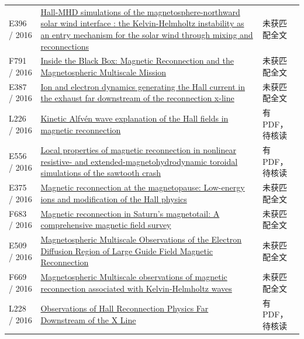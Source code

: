 \begin{longtable}{P{24mm}P{97mm}P{27mm}}
E396 / 2016 & \href{https://ui.adsabs.harvard.edu/abs/2016EGUGA..18.9105L/abstract}{Hall-MHD simulations of the magnetosphere-northward solar wind interface : the Kelvin-Helmholtz instability as an entry mechanism for the solar wind through mixing and reconnections} & 未获匹配全文\\

F791 / 2016 & \href{https://doi.org/10.1002/2015sw001313}{Inside the Black Box: Magnetic Reconnection and the Magnetospheric Multiscale Mission} & 未获匹配全文\\

E387 / 2016 & \href{https://doi.org/10.1063/1.4940322}{Ion and electron dynamics generating the Hall current in the exhaust far downstream of the reconnection x-line} & 未获匹配全文\\

L226 / 2016 & \href{https://doi.org/10.1002/2016gl071044}{Kinetic Alfvén wave explanation of the Hall fields in magnetic reconnection} & 有PDF，待核读\\

E556 / 2016 & \href{https://doi.org/10.1088/1361-6587/59/2/025007}{Local properties of magnetic reconnection in nonlinear resistive- and extended-magnetohydrodynamic toroidal simulations of the sawtooth crash} & 有PDF，待核读\\

E375 / 2016 & \href{https://ui.adsabs.harvard.edu/abs/2016EGUGA..1813235A/abstract}{Magnetic reconnection at the magnetopause: Low-energy ions and modification of the Hall physics} & 未获匹配全文\\

F683 / 2016 & \href{https://doi.org/10.1002/2015ja022005}{Magnetic reconnection in Saturn's magnetotail: A comprehensive magnetic field survey} & 未获匹配全文\\

E509 / 2016 & \href{https://doi.org/10.1103/physrevlett.117.015001}{Magnetospheric Multiscale Observations of the Electron Diffusion Region of Large Guide Field Magnetic Reconnection} & 未获匹配全文\\

F669 / 2016 & \href{https://doi.org/10.1002/2016gl068783}{Magnetospheric Multiscale observations of magnetic reconnection associated with Kelvin‐Helmholtz waves} & 未获匹配全文\\

L228 / 2016 & \href{https://doi.org/10.1103/physrevlett.117.185102}{Observations of Hall Reconnection Physics Far Downstream of the X Line} & 有PDF，待核读\\


\end{longtable}
